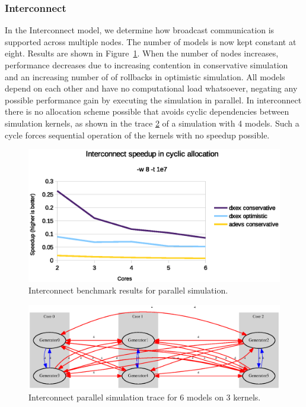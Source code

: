 \subsubsection{Interconnect}\label{subsec:parallelinterconnect}
In the Interconnect model, we determine how broadcast communication is supported across multiple nodes.
The number of models is now kept constant at eight.
Results are shown in Figure~\ref{fig:interconnect_benchmark_parallel}.
When the number of nodes increases, performance decreases due to increasing contention in conservative simulation and an increasing number of of rollbacks in optimistic simulation.
All models depend on each other and have no computational load whatsoever, negating any possible performance gain by executing the simulation in parallel.
In interconnect there is no allocation scheme possible that avoids cyclic dependencies between simulation kernels, as shown in the trace \ref{fig:interconnect_allocation_parallel} of a simulation with 4 models. Such a cycle forces sequential operation of the kernels with no speedup possible.

\begin{figure}
	\center
	\includegraphics[width=\plotfraction\columnwidth]{fig/interconnect_parallel.eps}
	\caption{Interconnect benchmark results for parallel simulation.}
	\label{fig:interconnect_benchmark_parallel}
\end{figure}
\begin{figure}
	\center
	\includegraphics[width=\plotfraction\columnwidth]{fig/interconnect_parallel_allocation.eps}
	\caption{Interconnect parallel simulation trace for 6 models on 3 kernels.}
	\label{fig:interconnect_allocation_parallel}
\end{figure}

